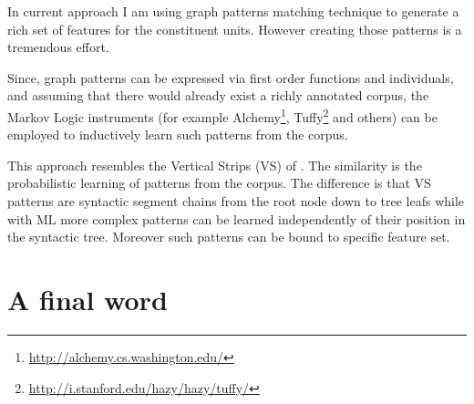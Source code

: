 In current approach I am using graph patterns matching technique to generate a rich set of features for the constituent units. However creating those patterns is a tremendous effort. 

Since, graph patterns can be expressed via first order functions and individuals, and assuming that there would already exist a richly annotated corpus, the Markov Logic instruments (for example Alchemy\footnote{\url{http://alchemy.cs.washington.edu/}}, Tuffy\footnote{\url{http://i.stanford.edu/hazy/hazy/tuffy/}} and others) can be employed to inductively learn such patterns from the corpus. 

This approach resembles the Vertical Strips (VS) of \citet{ODonoghue1991a}. The similarity is the probabilistic learning of patterns from the corpus. The difference is that VS patterns are syntactic segment chains from the root node down to tree leafs while with ML more complex patterns can be learned independently of their position in the syntactic tree. Moreover such patterns can be bound to specific feature set. 


%


\section{A final word}
